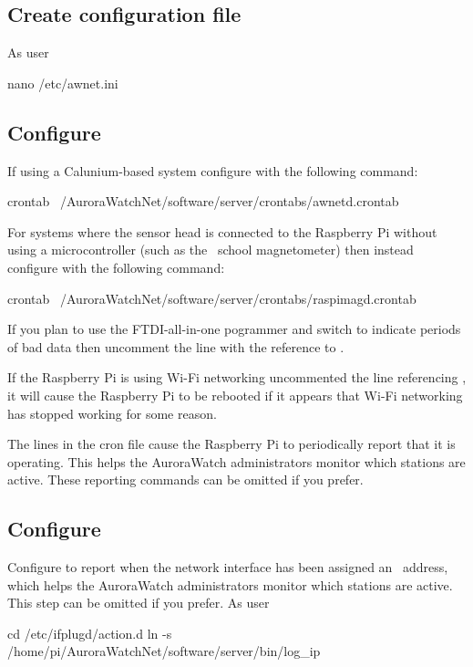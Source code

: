\subsection{Create configuration file}

As user \rootUser
\begin{Cmd}
nano /etc/awnet.ini
\end{Cmd}


\newpage
\subsection{Configure \protect{}}
\label{sec:cron-configuration}

If using a Calunium-based system configure  with the
following command:
\begin{Cmd}
crontab ~/AuroraWatchNet/software/server/crontabs/awnetd.crontab
\end{Cmd}

For systems where the sensor head is connected to the Raspberry Pi
without using a microcontroller (such as the \bgs\ school
magnetometer) then instead configure  with the
following command:
\begin{Cmd}
crontab ~/AuroraWatchNet/software/server/crontabs/raspimagd.crontab
\end{Cmd}

If you plan to use the FTDI-all-in-one pogrammer and switch to
indicate periods of bad data then uncomment the line with the
reference to .

If the Raspberry Pi is using Wi-Fi networking uncommented the line
referencing , it will cause the Raspberry
Pi to be rebooted if it appears that Wi-Fi networking has stopped
working for some reason.

The  lines in the cron file cause the Raspberry Pi to
periodically report that it is operating. This helps the AuroraWatch
administrators monitor which stations are active. These reporting
commands can be omitted if you prefer.


\subsection{Configure \protect{}}

Configure  to report when the network interface has
been assigned an \ip\ address, which helps the AuroraWatch
administrators monitor which stations are active. This step can be
omitted if you prefer. As user \rootUser
\begin{Cmd}
cd /etc/ifplugd/action.d
ln -s /home/pi/AuroraWatchNet/software/server/bin/log_ip
\end{Cmd}


